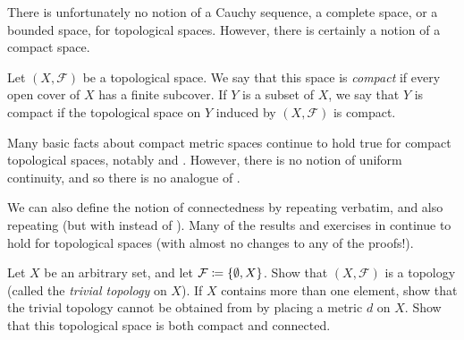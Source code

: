 \begin{note}
  There is unfortunately no notion of a Cauchy sequence, a complete space, or a bounded space, for topological spaces.
  However, there is certainly a notion of a compact space.
\end{note}

\begin{defn}\label{ii:2.5.9}
  Let \((X, \mathcal{F})\) be a topological space.
  We say that this space is \emph{compact} if every open cover of \(X\) has a finite subcover.
  If \(Y\) is a subset of \(X\), we say that \(Y\) is compact if the topological space on \(Y\) induced by \((X, \mathcal{F})\) is compact.
\end{defn}

\begin{note}
  Many basic facts about compact metric spaces continue to hold true for compact topological spaces, notably  and .
  However, there is no notion of uniform continuity, and so there is no analogue of .
\end{note}

\begin{note}
  We can also define the notion of connectedness by repeating  verbatim, and also repeating  (but with  instead of ).
  Many of the results and exercises in  continue to hold for topological spaces
  (with almost no changes to any of the proofs!).
\end{note}

\exercisesection

\begin{ex}\label{ii:ex:2.5.1}
  Let \(X\) be an arbitrary set, and let \(\mathcal{F} \coloneqq \left\lbrace\emptyset, X\right\rbrace\).
  Show that \((X, \mathcal{F})\) is a topology
  (called the \emph{trivial topology} on \(X\)).
  If \(X\) contains more than one element, show that the trivial topology cannot be obtained from by placing a metric \(d\) on \(X\).
  Show that this topological space is both compact and connected.
\end{ex}

